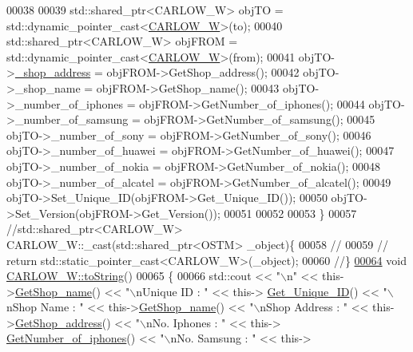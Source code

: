 \begin{DoxyCode}
00038 
00039     std::shared\_ptr<CARLOW\_W> objTO = std::dynamic\_pointer\_cast<\hyperlink{class_c_a_r_l_o_w___w}{CARLOW\_W}>(to);
00040     std::shared\_ptr<CARLOW\_W> objFROM = std::dynamic\_pointer\_cast<\hyperlink{class_c_a_r_l_o_w___w}{CARLOW\_W}>(from);
00041     objTO->\hyperlink{class_c_a_r_l_o_w___w_acaa886b26f5a60d500f13709340d34cf_acaa886b26f5a60d500f13709340d34cf}{\_shop\_address} = objFROM->GetShop\_address();
00042     objTO->\_shop\_name = objFROM->GetShop\_name();
00043     objTO->\_number\_of\_iphones = objFROM->GetNumber\_of\_iphones();
00044     objTO->\_number\_of\_samsung = objFROM->GetNumber\_of\_samsung();
00045     objTO->\_number\_of\_sony = objFROM->GetNumber\_of\_sony();
00046     objTO->\_number\_of\_huawei = objFROM->GetNumber\_of\_huawei();
00047     objTO->\_number\_of\_nokia = objFROM->GetNumber\_of\_nokia();
00048     objTO->\_number\_of\_alcatel = objFROM->GetNumber\_of\_alcatel();
00049     objTO->Set\_Unique\_ID(objFROM->Get\_Unique\_ID());
00050     objTO->Set\_Version(objFROM->Get\_Version());
00051     
00052    
00053 \}
00057 \textcolor{comment}{//std::shared\_ptr<CARLOW\_W> CARLOW\_W::\_cast(std::shared\_ptr<OSTM> \_object)\{}
00058 \textcolor{comment}{//    }
00059 \textcolor{comment}{//    return std::static\_pointer\_cast<CARLOW\_W>(\_object);}
00060 \textcolor{comment}{//\}}
\hypertarget{_c_a_r_l_o_w___w_8cpp_source.tex_l00064}{}\hyperlink{class_c_a_r_l_o_w___w_a79e683650f861b59752fb027a5f16e5a_a79e683650f861b59752fb027a5f16e5a}{00064} \textcolor{comment}{}\textcolor{keywordtype}{void} \hyperlink{class_c_a_r_l_o_w___w_a79e683650f861b59752fb027a5f16e5a_a79e683650f861b59752fb027a5f16e5a}{CARLOW\_W::toString}()
00065 \{
00066    std::cout << \textcolor{stringliteral}{"\(\backslash\)n"} <<  this->\hyperlink{class_c_a_r_l_o_w___w_a68235a63964645c525620053a33de863_a68235a63964645c525620053a33de863}{GetShop\_name}() << \textcolor{stringliteral}{"\(\backslash\)nUnique ID : "} << this->
      \hyperlink{class_o_s_t_m_a5a01a8b98d16b1d1904ecf9356e7b71d_a5a01a8b98d16b1d1904ecf9356e7b71d}{Get\_Unique\_ID}() << \textcolor{stringliteral}{"\(\backslash\)nShop Name : "}  << this->\hyperlink{class_c_a_r_l_o_w___w_a68235a63964645c525620053a33de863_a68235a63964645c525620053a33de863}{GetShop\_name}() << \textcolor{stringliteral}{"\(\backslash\)nShop Address : 
      "} << this->\hyperlink{class_c_a_r_l_o_w___w_af48a2f69706be684115758820ce79ddd_af48a2f69706be684115758820ce79ddd}{GetShop\_address}() << \textcolor{stringliteral}{"\(\backslash\)nNo. Iphones : "} << this->
      \hyperlink{class_c_a_r_l_o_w___w_a50395c707116ea1176743ed98c6b1f76_a50395c707116ea1176743ed98c6b1f76}{GetNumber\_of\_iphones}() << \textcolor{stringliteral}{"\(\backslash\)nNo. Samsung : "} << this->

\end{DoxyCode}
